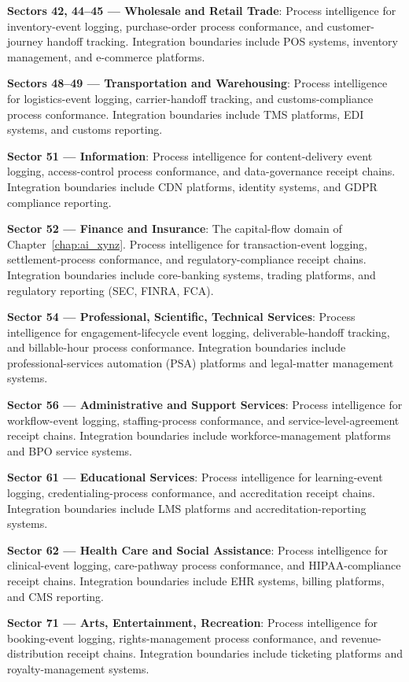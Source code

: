 \textbf{Sectors 42, 44--45 --- Wholesale and Retail Trade}: Process intelligence for inventory-event logging, purchase-order process conformance, and customer-journey handoff tracking. Integration boundaries include POS systems, inventory management, and e-commerce platforms.

\textbf{Sectors 48--49 --- Transportation and Warehousing}: Process intelligence for logistics-event logging, carrier-handoff tracking, and customs-compliance process conformance. Integration boundaries include TMS platforms, EDI systems, and customs reporting.

\textbf{Sector 51 --- Information}: Process intelligence for content-delivery event logging, access-control process conformance, and data-governance receipt chains. Integration boundaries include CDN platforms, identity systems, and GDPR compliance reporting.

\textbf{Sector 52 --- Finance and Insurance}: The capital-flow domain of Chapter~\ref{chap:ai_xynz}. Process intelligence for transaction-event logging, settlement-process conformance, and regulatory-compliance receipt chains. Integration boundaries include core-banking systems, trading platforms, and regulatory reporting (SEC, FINRA, FCA).

\textbf{Sector 54 --- Professional, Scientific, Technical Services}: Process intelligence for engagement-lifecycle event logging, deliverable-handoff tracking, and billable-hour process conformance. Integration boundaries include professional-services automation (PSA) platforms and legal-matter management systems.

\textbf{Sector 56 --- Administrative and Support Services}: Process intelligence for workflow-event logging, staffing-process conformance, and service-level-agreement receipt chains. Integration boundaries include workforce-management platforms and BPO service systems.

\textbf{Sector 61 --- Educational Services}: Process intelligence for learning-event logging, credentialing-process conformance, and accreditation receipt chains. Integration boundaries include LMS platforms and accreditation-reporting systems.

\textbf{Sector 62 --- Health Care and Social Assistance}: Process intelligence for clinical-event logging, care-pathway process conformance, and HIPAA-compliance receipt chains. Integration boundaries include EHR systems, billing platforms, and CMS reporting.

\textbf{Sector 71 --- Arts, Entertainment, Recreation}: Process intelligence for booking-event logging, rights-management process conformance, and revenue-distribution receipt chains. Integration boundaries include ticketing platforms and royalty-management systems.


